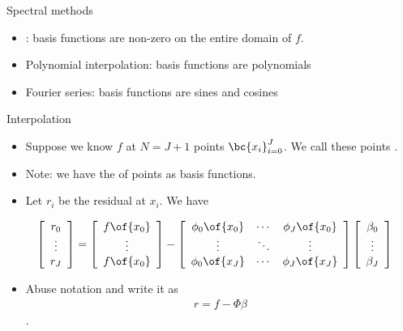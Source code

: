 \documentclass[11pt,xcolor={dvipsnames},aspectratio=159,hyperref={pdftex,pdfpagemode=UseNone,hidelinks,pdfdisplaydoctitle=true},usepdftitle=false]{beamer}
\begin{document}
\begin{frame}
    \end{frame}

    \begin{frame}{Spectral methods}
    \begin{itemize} 
        \item {}: basis functions are non-zero on the entire domain of $f$.
        \item Polynomial interpolation: basis functions are polynomials
        \item Fourier series: basis functions are sines and cosines
    \end{itemize}
        \end{frame}
    

\begin{frame}{Interpolation}   
    \begin{itemize} 
      \item Suppose we know $f$ at $N=J+1$ points $\bc{x_i}_{i=0}^{J}$. We call these points .
      \item Note: we have the  of points as basis functions.
      \item Let $r_i$ be the residual at $x_i$. We have
      
      \begin{align*}
        \left[\begin{array}{c}
        r_0\\
        \vdots\\
        r_J\\
        \end{array}\right] & =\left[\begin{array}{c}
        f\of{x_0}\\
        \vdots \\
        f\of{x_0}\\
        \end{array}\right]-\left[\begin{array}{ccc}
        \phi_{0}\of{x_0} & \cdots & \phi_{J}\of{x_0}\\
        \vdots & \ddots & \vdots \\
        \phi_{0}\of{x_J} & \cdots & \phi_{J}\of{x_J}\\
        \end{array}\right]\left[\begin{array}{c}
        \beta_0 \\
        \vdots \\
        \beta_J \\
        \end{array}\right]
    \end{align*}
    \item Abuse notation and write it as \begin{align*}r = f - \Phi \beta\end{align*}.  
        \end{itemize}
      
\end{frame}
\end{document}
